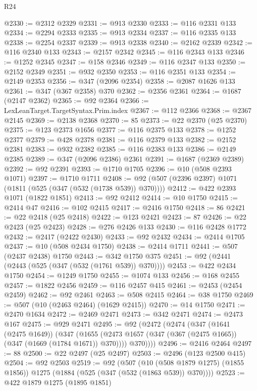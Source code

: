 \begin{lexlean}{R24}
\begin{coremodule}
{{{{{{{{{{{{{{{{{{{{{{{{{{{{{{{{{{{{{{{{{{{{{{{{{{{{{{{{{{{{{{{{{{{{{{{{{{{{{{{{{{{{{{{{{{{{{{{{{{{{{{{{{{{{{{{{{{{{{{{{{{{{{{{{{{{{{{{{{{{{{{{{{{{{{{{{{{{{{{{{{{{{{{{{{{{{{{{{{{{{{{{{{{{{{{{{{{{@2330 := @2312 @2329
@2331 := @913 @2330
@2333 := @116 @2331 @133
@2334 := @2294 @2333
@2335 := @913 @2334
@2337 := @116 @2335 @133
@2338 := @2254 @2337
@2339 := @913 @2338
@2340 := @2162 @2339
@2342 := @116 @2340 @133
@2343 := @2157 @2342
@2345 := @116 @2343 @133
@2346 := @1252 @2345
@2347 := @158 @2346
@2349 := @116 @2347 @133
@2350 := @2152 @2349
@2351 := @932 @2350
@2353 := @116 @2351 @133
@2354 := @2149 @2353
@2356 := @347 (@2096 @2354)
@2358 := @2087 @1626 @133
@2361 := @347 (@367 @2358) @370
@2362 := @2356 @2361
@2364 := @1687 (@2147 @2362)
@2365 := @92 @2364
@2366 := LexLeanTarget.TargetSyntax.Prim.index
@2367 := @112 @2366
@2368 := @2367 @2145
@2369 := @2138 @2368
@2370 := 85
@2373 := @22 @2370 (@25 @2370)
@2375 := @123 @2373 @1656
@2377 := @116 @2375 @133
@2378 := @1252 @2377
@2379 := @428 @2378
@2381 := @116 @2379 @133
@2382 := @2152 @2381
@2383 := @932 @2382
@2385 := @116 @2383 @133
@2386 := @2149 @2385
@2389 := @347 (@2096 @2386) @2361
@2391 := @1687 (@2369 @2389)
@2392 := @92 @2391
@2393 := @1710 @1705
@2396 := @10 (@508 @2393 @1071)
@2397 := @1710 @1711
@2408 := @92 (@507 (@2396 @2397) @1071 (@1811 (@525 (@347 (@532 (@1738 @539)) @370))))
@2412 := @422 @2393 @1071 (@1822 @1851)
@2413 := @92 @2412
@2414 := @10 @1750
@2415 := @2414 @47
@2416 := @102 @2415
@2417 := @2416 @1750
@2418 := 86
@2421 := @22 @2418 (@25 @2418)
@2422 := @123 @2421
@2423 := 87
@2426 := @22 @2423 (@25 @2423)
@2428 := @276 @2426 @133
@2430 := @116 @2428 @1772
@2432 := @2417 (@2422 @2430)
@2433 := @92 @2432
@2434 := @2414 @1705
@2437 := @10 (@508 @2434 @1750)
@2438 := @2414 @1711
@2441 := @507 (@2437 @2438) @1750
@2443 := @342 @1750 @375
@2451 := @92 (@2441 (@2443 (@525 (@347 (@532 (@1761 @539)) @370))))
@2453 := @422 @2434 @1750
@2454 := @1249 @1750
@2455 := @1074 @133
@2456 := @168 @2455
@2457 := @1822 @2456
@2459 := @116 @2457 @415
@2461 := @2453 (@2454 @2459)
@2462 := @92 @2461
@2463 := @508 @2415
@2464 := @38 @1750
@2469 := @507 (@10 (@2463 @2464) (@1629 @2415))
@2470 := @14 @1750
@2471 := @2470 @1634
@2472 := @2469 @2471
@2473 := @342 @2471
@2474 := @2473 @167
@2475 := @929 @2471
@2495 := @92
    (@2472
      (@2474
        (@347
          (@1641 (@2475 @1649))
          (@347
            (@1655 (@2473 @1657 (@347 (@367 (@2475 @1665)) (@347 (@1669 (@1784 @1671)) @370))))
            @370))))
@2496 := @2416 @2464
@2497 := 88
@2500 := @22 @2497 (@25 @2497)
@2503 := @2496 (@123 @2500 @415)
@2504 := @92 @2503
@2519 := @92
    (@507
      (@10 (@508 @1879 @1275) (@1855 @1856))
      @1275
      (@1884 (@525 (@347 (@532 (@1863 @539)) @370))))
@2523 := @422 @1879 @1275 (@1895 @1851)
}}}}}}}}}}}}}}}}}}}}}}}}}}}}}}}}}}}}}}}}}}}}}}}}}}}}}}}}}}}}}}}}}}}}}}}}}}}}}}}}}}}}}}}}}}}}}}}}}}}}}}}}}}}}}}}}}}}}}}}}}}}}}}}}}}}}}}}}}}}}}}}}}}}}}}}}}}}}}}}}}}}}}}}}}}}}}}}}}}}}}}}}}}}}}}}}}}}
\end{coremodule}
\end{lexlean}
